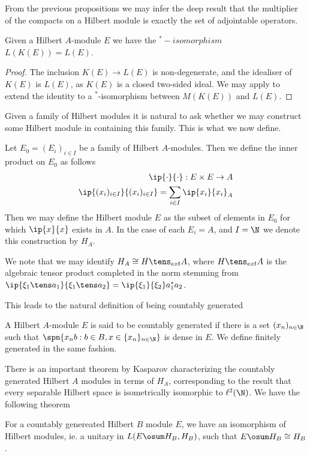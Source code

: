 From the previous propositions we may infer the deep result that the multiplier of the compacts on a Hilbert module is exactly the set of adjointable operators. 
\begin{proposition}
	Given a Hilbert $A$-module $E$ we have the $^*-isomorphism$ $L(K(E))=L(E)$.  
\end{proposition}
\begin{proof}
	The inclusion $K(E)\to L(E)$ is non-degenerate, and the idealiser of $K(E)$ is $L(E)$, as $K(E)$ is a closed two-sided ideal. We may apply  to extend the identity to a $^*$-isomorphism between $M(K(E))$ and $L(E)$. 
\end{proof}
Given a family of Hilbert modules it is natural to ask whether we may construct some Hilbert module in containing this family. This is what we now define. 
\begin{definition}
	Let $E_0=(E_i)_{i\in I}$ be a family of Hilbert $A$-modules. Then we define the inner product on $E_0$ as follows
	\begin{align*}
		\ip{\cdot}{\cdot}: E\times E\to A \\
		\ip{(x_i)_{i\in I}}{(x_i)_{i\in I}}=\sum_{i\in I} \ip{x_i}{x_i}_A
	\end{align*}
	Then we may define the Hilbert module $E$ as the subset of elements in $E_0$ for which $\ip{x}{x}$ exists in $A$.
	In the case of each $E_i=A$, and $I=\N$ we denote this construction by $H_A$. 
\end{definition}
\begin{remark}
	We note that we may identify $H_A\cong H\tens_{ext} A$, where $H\tens_{ext} A$ is the algebraic tensor product completed in the norm stemming from $\ip{\xi_1\tens a_1}{\xi_1\tens a_2}=\ip{\xi_1}{\xi_2}a_1^*a_2$. 
\end{remark}
This leads to the natural definition of being countably generated
\begin{definition}
	A Hilbert $A$-module $E$ is said to be countably generated if there is a set $(x_n)_{n\in \N}$ such that $\spn\{x_n b : b\in B, x\in \{x_n\}_{n\in \N}\}$ is dense in $E$. We define finitely generated in the same fashion. 
\end{definition}
There is an important theorem by Kasparov characterizing the countably generated Hilbert $A$ modules in terms of $H_A$, corresponding to the result that every separable Hilbert space is isometrically isomorphic to $\ell^2(\N)$. 
We have the following theorem 
\begin{theorem}\label{kasparovstabilization}
	For a countably genereated Hilbert $B$ module $E$, we have an isomorphism of Hilbert modules, ie. a unitary in $L(E\osum H_B,H_B)$, such that $E\osum H_B\cong H_B$. 
\end{theorem}
